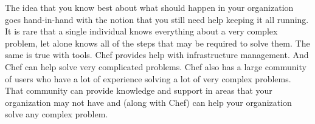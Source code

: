 The idea that you know best about what should happen in your organization goes hand-in-hand with the notion that you still need help keeping it all running. It is rare that a single individual knows everything about a very complex problem, let alone knows all of the steps that may be required to solve them. The same is true with tools. Chef provides help with infrastructure management. And Chef can help solve very complicated problems. Chef also has a large community of users who have a lot of experience solving a lot of very complex problems. That community can provide knowledge and support in areas that your organization may not have and (along with Chef) can help your organization solve any complex problem.